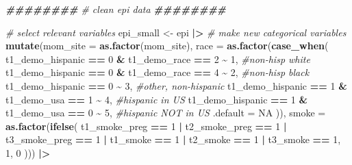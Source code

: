 \documentclass[12pt, twoside]{amherstthesis}
\newenvironment{Shaded}{\begin{snugshade}}{\end{snugshade}}
\newcommand{\AttributeTok}[1]{\textcolor[rgb]{0.13,0.29,0.53}{#1}}
\newcommand{\CommentTok}[1]{\textcolor[rgb]{0.56,0.35,0.01}{\textit{#1}}}
\newcommand{\ConstantTok}[1]{\textcolor[rgb]{0.56,0.35,0.01}{#1}}
\newcommand{\DecValTok}[1]{\textcolor[rgb]{0.00,0.00,0.81}{#1}}
\newcommand{\DocumentationTok}[1]{\textcolor[rgb]{0.56,0.35,0.01}{\textbf{\textit{#1}}}}
\newcommand{\FunctionTok}[1]{\textcolor[rgb]{0.13,0.29,0.53}{\textbf{#1}}}
\newcommand{\NormalTok}[1]{#1}
\newcommand{\OtherTok}[1]{\textcolor[rgb]{0.56,0.35,0.01}{#1}}
\newcommand{\SpecialCharTok}[1]{\textcolor[rgb]{0.81,0.36,0.00}{\textbf{#1}}}
\begin{document}
\scriptsize
\begin{Shaded}
\begin{Highlighting}[]
\DocumentationTok{\#\#\#\#\#\#\#\#}
\CommentTok{\# clean epi data}
\DocumentationTok{\#\#\#\#\#\#\#\#}

\CommentTok{\# select relevant variables}
\NormalTok{epi\_small }\OtherTok{\textless{}{-}}\NormalTok{ epi }\SpecialCharTok{|\textgreater{}} 
  \CommentTok{\# make new categorical variables}
  \FunctionTok{mutate}\NormalTok{(}\AttributeTok{mom\_site =} \FunctionTok{as.factor}\NormalTok{(mom\_site), }
         \AttributeTok{race =} \FunctionTok{as.factor}\NormalTok{(}\FunctionTok{case\_when}\NormalTok{(}
\NormalTok{           t1\_demo\_hispanic }\SpecialCharTok{==} \DecValTok{0} \SpecialCharTok{\&}\NormalTok{ t1\_demo\_race }\SpecialCharTok{==} \DecValTok{2} \SpecialCharTok{\textasciitilde{}} \DecValTok{1}\NormalTok{, }\CommentTok{\#non{-}hisp white}
\NormalTok{           t1\_demo\_hispanic }\SpecialCharTok{==} \DecValTok{0} \SpecialCharTok{\&}\NormalTok{ t1\_demo\_race }\SpecialCharTok{==} \DecValTok{4} \SpecialCharTok{\textasciitilde{}} \DecValTok{2}\NormalTok{, }\CommentTok{\#non{-}hisp black}
\NormalTok{           t1\_demo\_hispanic }\SpecialCharTok{==} \DecValTok{0} \SpecialCharTok{\textasciitilde{}} \DecValTok{3}\NormalTok{, }\CommentTok{\#other, non{-}hispanic}
\NormalTok{           t1\_demo\_hispanic }\SpecialCharTok{==} \DecValTok{1} \SpecialCharTok{\&}\NormalTok{ t1\_demo\_usa }\SpecialCharTok{==} \DecValTok{1} \SpecialCharTok{\textasciitilde{}} \DecValTok{4}\NormalTok{, }\CommentTok{\#hispanic in US}
\NormalTok{           t1\_demo\_hispanic }\SpecialCharTok{==} \DecValTok{1} \SpecialCharTok{\&}\NormalTok{ t1\_demo\_usa }\SpecialCharTok{==} \DecValTok{0} \SpecialCharTok{\textasciitilde{}} \DecValTok{5}\NormalTok{, }\CommentTok{\#hispanic NOT in US}
           \AttributeTok{.default =} \ConstantTok{NA}
\NormalTok{         )), }
         \AttributeTok{smoke =} \FunctionTok{as.factor}\NormalTok{(}\FunctionTok{ifelse}\NormalTok{(}
\NormalTok{           t1\_smoke\_preg }\SpecialCharTok{==} \DecValTok{1} \SpecialCharTok{|}\NormalTok{ t2\_smoke\_preg }\SpecialCharTok{==} \DecValTok{1} \SpecialCharTok{|}\NormalTok{ t3\_smoke\_preg }\SpecialCharTok{==} \DecValTok{1} \SpecialCharTok{|}
\NormalTok{             t1\_smoke }\SpecialCharTok{==} \DecValTok{1} \SpecialCharTok{|}\NormalTok{ t2\_smoke }\SpecialCharTok{==} \DecValTok{1} \SpecialCharTok{|}\NormalTok{ t3\_smoke }\SpecialCharTok{==} \DecValTok{1}\NormalTok{, }\DecValTok{1}\NormalTok{, }\DecValTok{0}
\NormalTok{         ))) }\SpecialCharTok{|\textgreater{}} 

\end{Highlighting}
\end{Shaded}
\end{document}
